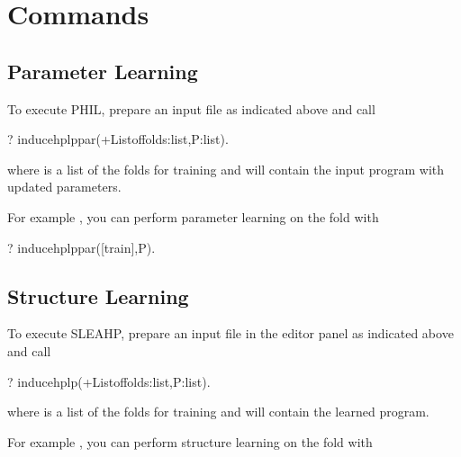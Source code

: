 \documentclass[letterpaper,10pt,english]{sphinxmanual}
\begin{document}
\section{Commands}
\label{\detokenize{index:commands}}

\subsection{Parameter Learning}
\label{\detokenize{index:parameter-learning}}
To execute PHIL, prepare an input file as indicated above and call

\begin{sphinxVerbatim}[commandchars=\\\{\}]
?\PYGZhy{} induce\PYGZus{}hplp\PYGZus{}par(+List\PYGZus{}of\PYGZus{}folds:list,\PYGZhy{}P:list).
\end{sphinxVerbatim}

where  is a list of the folds for training and  will contain the input program with updated parameters.

For example , you can perform parameter learning on the  fold with

\begin{sphinxVerbatim}[commandchars=\\\{\}]
?\PYGZhy{} induce\PYGZus{}hplp\PYGZus{}par([train],P).
\end{sphinxVerbatim}


\subsection{Structure Learning}
\label{\detokenize{index:structure-learning}}
To execute SLEAHP, prepare an input file in the editor panel as indicated above and call

\begin{sphinxVerbatim}[commandchars=\\\{\}]
?\PYGZhy{} induce\PYGZus{}hplp(+List\PYGZus{}of\PYGZus{}folds:list,\PYGZhy{}P:list).
\end{sphinxVerbatim}

where  is a list of the folds for training and  will contain the learned program.

For example , you can perform structure learning on the  fold with
\end{document}
